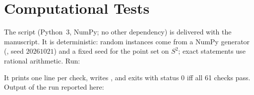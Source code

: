 \documentclass[11pt,a4paper]{article}
\theoremstyle{plain}
\theoremstyle{definition}
\begin{document}
\section{Computational Tests}\label{app:tests}
The script  (Python~3, NumPy; no other dependency) is delivered with the manuscript. It is deterministic: random instances come from a NumPy generator (, seed $20261021$) and a fixed seed for the point set on $S^2$; exact statements use rational arithmetic. Run:
\begin{center}\end{center}
It prints one line per check, writes , and exits with status $0$ iff all 61 checks pass. Output of the run reported here:
\end{document}
